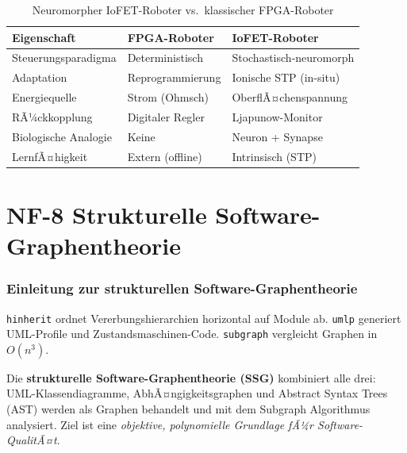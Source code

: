 ﻿\documentclass[a4paper,12pt]{scrreprt}
\theoremstyle{definition}
\begin{document}
\begin{table}[H]
\caption{Neuromorpher IoFET-Roboter vs.\ klassischer FPGA-Roboter}
\label{tab:nf7_vergleich}
\begin{tabular}{lll}
\toprule
\textbf{Eigenschaft}         & \textbf{FPGA-Roboter}     & \textbf{IoFET-Roboter} \\
\midrule
Steuerungsparadigma          & Deterministisch           & Stochastisch-neuromorph \\
Adaptation                   & Reprogrammierung          & Ionische STP (in-situ) \\
Energiequelle                & Strom (Ohmsch)            & OberflÃ¤chenspannung \\
RÃ¼ckkopplung                 & Digitaler Regler          & Ljapunow-Monitor \\
Biologische Analogie         & Keine                     & Neuron + Synapse \\
LernfÃ¤higkeit                & Extern (offline)          & Intrinsisch (STP) \\
\bottomrule
\end{tabular}
\end{table}

\part{NF-8 \quad Strukturelle Software-Graphentheorie}
\label{part:nf8}

\section{Einleitung zur strukturellen Software-Graphentheorie}

\texttt{hinherit} ordnet Vererbungshierarchien horizontal auf Module ab.
\texttt{umlp} generiert UML-Profile und Zustandsmaschinen-Code.
\texttt{subgraph} vergleicht Graphen in $O(n^3)$.

Die \textbf{strukturelle Software-Graphentheorie (SSG)} kombiniert
alle drei: UML-Klassendiagramme, AbhÃ¤ngigkeitsgraphen und
Abstract Syntax Trees (AST) werden als Graphen behandelt und mit
dem Subgraph Algorithmus analysiert. Ziel ist eine
\emph{objektive, polynomielle Grundlage fÃ¼r Software-QualitÃ¤t}.
\end{document}
